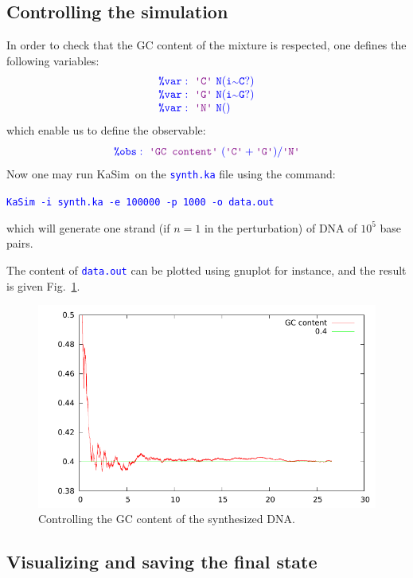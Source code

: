 \documentclass[11pt]{article}
\def\ks{{\sc KaSim}}
\def\ttt#1{\texttt{\textcolor{blue}{#1}}}
\def\mtt#1{{\tt{\color{blue} #1}}}
\def\lab#1{\hbox{\ttt{\color{Plum}\textquotesingle #1\textquotesingle}}}
\def\int{{\scriptstyle\sim}}
\def\Kadec#1#2{\color{blue}\mtt{\hbox{\color{blue}\tt\%}#1:\ #2}}
\begin{document}
\subsection{Controlling the simulation}
In order to check that the GC content of the mixture is respected, one defines the following variables:
$$
\begin{array}{l}
\Kadec{var}{\lab{C}\ N(i\int C?)} \\
\Kadec{var}{\lab{G}\ N(i\int G?)} \\
\Kadec{var}{\lab{N}\ N()} \\
\end{array}
$$
which enable us to define the observable:
$$
\Kadec{obs}{\lab{GC content}\ (\lab{C}+\lab{G})/\lab{N}}
$$
Now one may run \ks~on the \ttt{synth.ka} file using the command:
\begin{center}\ttt{KaSim -i synth.ka -e 100000 -p 1000 -o data.out}\end{center}
which will generate one strand (if $n=1$ in the perturbation) of DNA of $10^5$ base pairs.

The content of \ttt{data.out} can be plotted using gnuplot for instance, and the result is given Fig.~\ref{fig:plot}.

%
\begin{figure}[ht]
\begin{center}
\includegraphics[scale=1]{plot.pdf}
\caption{Controlling the GC content of the synthesized DNA.}\label{fig:plot}
\end{center}
\end{figure}

\subsection{Visualizing and saving the final state}
\end{document}
